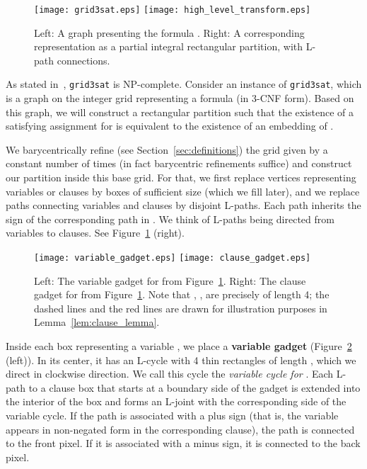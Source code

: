 \documentclass[12pt]{article}
\begin{document}
\begin{figure}
\centering
\texttt{[image: grid3sat.eps]}
\hspace{1cm}
\texttt{[image: high\_level\_transform.eps]}
\caption{Left: A graph presenting the formula .
Right: A corresponding representation as a partial integral rectangular partition, with
L-path connections.}
\label{fig:grid3sat}
\end{figure}

As stated in~\cite{godau-difficulty}, \texttt{grid3sat} is NP-complete.
Consider an instance  of \texttt{grid3sat},
which is a graph on the integer grid representing a formula  (in 3-CNF form).
Based on this graph, we will construct a rectangular partition  such that the existence
of a satisfying assignment for  is equivalent to the existence of an
embedding of . 

We barycentrically refine (see Section~\ref{sec:definitions}) the grid
given by  a constant number of times 
(in fact  barycentric refinements suffice) and construct our partition inside
this base grid. For that, we first replace vertices representing variables or clauses
by boxes of sufficient size (which we fill later), and we replace paths connecting
variables and clauses by disjoint L-paths. 
Each path inherits the sign of the corresponding path in .
We think of L-paths being
directed from variables to clauses. See Figure~\ref{fig:grid3sat} (right).

\begin{figure}
\centering
\texttt{[image: variable\_gadget.eps]}
\hspace{1cm}
\texttt{[image: clause\_gadget.eps]}
\caption{Left: The variable gadget for  from Figure~\ref{fig:grid3sat}.
Right: The clause gadget for  from Figure~\ref{fig:grid3sat}.
Note that , ,  are precisely of length 4; the dashed lines and the red lines
are drawn for illustration purposes in Lemma~\ref{lem:clause_lemma}.
}
\label{fig:gadgets}
\end{figure}

Inside each box representing a variable , we place a \textbf{variable gadget} 
(Figure~\ref{fig:gadgets} (left)).
In its center, it has an L-cycle with 4 thin rectangles of length ,
which we direct in clockwise direction.
We call this cycle the \emph{variable cycle for }.
Each L-path to a clause box that starts at a boundary side of the gadget is extended
into the interior of the box and forms an L-joint with 
the corresponding side of the variable cycle.
If the path is associated with a plus sign (that is,
the variable appears in non-negated form in the corresponding clause), the path
is connected to the front pixel. If it is associated with a minus sign, it is connected
to the back pixel. 
\end{document}

